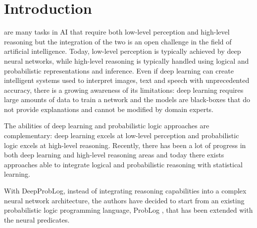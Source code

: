 \section{Introduction}
 are many tasks in AI that require both low-level perception and high-level reasoning but the integration of the two is an open challenge in the field of artificial intelligence. Today, low-level perception is typically achieved by deep neural networks, while high-level reasoning is typically handled using logical and probabilistic representations and inference. Even if deep learning can create intelligent systems used to interpret images, text and speech with unprecedented accuracy, there is a growing awareness of its limitations: deep learning requires large amounts of data to train a network and the models are black-boxes that do not provide explanations and cannot be modified by domain experts. 

The abilities of deep learning and probabilistic logic approaches are complementary: deep learning excels at low-level perception and probabilistic logic excels at high-level reasoning. Recently, there has been a lot of progress in both deep learning and high-level reasoning areas and today there exists approaches able to integrate logical and probabilistic reasoning with statistical learning.

With DeepProbLog, instead of integrating reasoning capabilities into a complex neural network architecture, the authors have decided to start from an existing probabilistic logic programming language, ProbLog \cite{ProbLog}, that has been extended with the neural predicates.
